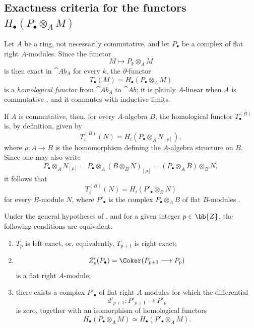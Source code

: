 \subsection{\texorpdfstring{Exactness criteria for the functors
$H_\bullet(P_\bullet\otimes_A M)$}{Exactness criteria for the functors H.(P. tensor M)}}
\label{subsection:III.7.4}
\label{III.7.4}

\begin{env}[7.4.1]
\label{III.7.4.1}
Let $A$ be a ring, not necessarily commutative, and let
$P_\bullet$ be a complex of flat right $A$-modules.  Since the
functor
\[
  M\longmapsto P_k\otimes_A M
\]
is then exact in $\cat{Ab}_A$ for every $k$, the
$\partial$-functor
\[
  T_\bullet(M)=H_\bullet(P_\bullet\otimes_A M)
  \tag{7.4.1.1}\label{III.7.4.1.1.eq}
\]
is a \emph{homological functor} from $\cat{Ab}_A$ to
$\cat{Ab}$; it is plainly $A$-linear when $A$ is commutative
, and it commutes with inductive limits.

If $A$ is commutative, then, for every $A$-algebra $B$, the
homological functor $T_\bullet^{(B)}$  is, by
definition, given by
\[
  T_i^{(B)}(N)
  =
  H_i(P_\bullet\otimes_A N_{[\rho]}),
  \tag{7.4.1.2}\label{III.7.4.1.2.eq}
\]
where $\rho:A\to B$ is the homomorphism defining the
$A$-algebra structure on $B$.  Since one may also write
\[
  P_\bullet\otimes_A N_{[\rho]}
  =
  P_\bullet\otimes_A(B\otimes_B N)_{[\rho]}
  =
  (P_\bullet\otimes_A B)\otimes_B N,
\]
it follows that
\[
  T_i^{(B)}(N)
  =
  H_i(P'_\bullet\otimes_B N)
  \tag{7.4.1.3}\label{III.7.4.1.3.eq}
\]
for every $B$-module $N$, where $P'_\bullet$ is the complex
$P_\bullet\otimes_A B$ of flat $B$-modules
.
\end{env}

\begin{proposition}[7.4.2]
\label{III.7.4.2}
Under the general hypotheses of , and for a
given integer $p\in\bb{Z}$, the following conditions are
equivalent:
\begin{enumerate}
  \item[(a)] $T_p$ is left exact, or, equivalently,
    $T_{p+1}$ is right exact;
  \item[(b)]
    \[
      Z'_p(P_\bullet)
      =
      \Coker(P_{p+1}\longrightarrow P_p)
    \]
    is a flat right $A$-module;
  \item[(c)] there exists a complex $P'_\bullet$ of flat right
    $A$-modules for which the differential
    \[
      d'_{p+1}:P'_{p+1}\longrightarrow P'_p
    \]
    is zero, together with an isomorphism of homological
    functors
    \[
      H_\bullet(P_\bullet\otimes_A M)
      \simeq
      H_\bullet(P'_\bullet\otimes_A M).
    \]
\end{enumerate}
\end{proposition}

